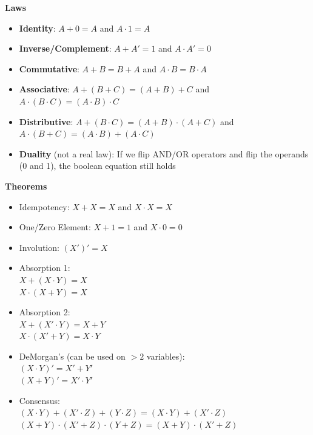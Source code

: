 \documentclass[a4paper]{article} \usepackage[backend=biber, style=numeric, sorting=none]{biblatex}
\begin{document}
\begin{multicols*}{4}
\textbf{Laws}
\begin{itemize}
\item \textbf{Identity}: $A + 0 = A$ and $A \cdot 1 = A$
\item \textbf{Inverse/Complement}: $A + A' = 1$ and $A \cdot A' = 0$
\item \textbf{Commutative}: $A + B = B + A$  and $A \cdot B = B \cdot A$
\item \textbf{Associative}: $A + (B + C) = (A + B) + C$ and $A \cdot (B \cdot C) = (A \cdot B) \cdot C$
\item \textbf{Distributive}: $A + (B \cdot C) = (A + B) \cdot (A + C)$ and $A \cdot (B + C) = (A \cdot B) + (A \cdot C)$
\item \textbf{Duality} (not a real law): If we flip AND/OR operators and flip the operands (0 and 1), the boolean equation still holds\\
\end{itemize}

\textbf{Theorems}
\begin{itemize}
\item Idempotency: $X + X = X$ and $X \cdot X = X$
\item One/Zero Element: $X + 1 = 1$ and $X \cdot 0 = 0$
\item Involution: $(X')' = X$
\item Absorption 1: \\ $X + (X \cdot Y) = X$ \\ $X \cdot (X + Y) = X$
\item Absorption 2: \\ $X + (X' \cdot Y) = X + Y$ \\ $X \cdot (X' + Y) = X \cdot Y$
\item DeMorgan's (can be used on $>2$ variables): \\ $(X \cdot Y)' = X' + Y'$ \\ $(X + Y)' = X' \cdot Y'$
\item Consensus: \\ $(X \cdot Y) + (X' \cdot Z) + (Y \cdot Z) = (X \cdot Y) + (X' \cdot Z)$ \\ $(X + Y) \cdot (X' + Z) \cdot (Y + Z) = (X + Y) \cdot (X' + Z)$\\
\end{itemize}


\end{multicols*}
\end{document}
